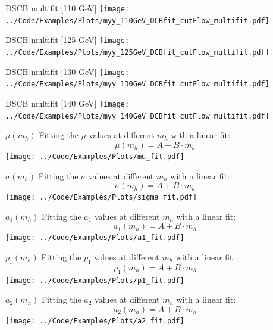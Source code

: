 \documentclass[10pt,UKenglish, leqno, xcolor = dvipsnames]{beamer}
\begin{document}
		\begin{frame}{DSCB multifit [110 GeV]}
			\vfill
			\texttt{[image: ../Code/Examples/Plots/myy\_110GeV\_DCBfit\_cutFlow\_multifit.pdf]}
			\vfill
		\end{frame}
	
		\begin{frame}{DSCB multifit [125 GeV]}
			\vfill
			\texttt{[image: ../Code/Examples/Plots/myy\_125GeV\_DCBfit\_cutFlow\_multifit.pdf]}
			\vfill
		\end{frame}
	
		\begin{frame}{DSCB multifit [130 GeV]}
			\vfill
			\texttt{[image: ../Code/Examples/Plots/myy\_130GeV\_DCBfit\_cutFlow\_multifit.pdf]}
			\vfill
		\end{frame}
	
		\begin{frame}{DSCB multifit [140 GeV]}
			\vfill
			\texttt{[image: ../Code/Examples/Plots/myy\_140GeV\_DCBfit\_cutFlow\_multifit.pdf]}
			\vfill
		\end{frame}
	
		\begin{frame}{$\mu(m_h)$}
			\vfill
			Fitting the $\mu$ values at different $m_h$ with a linear fit:
			$$
			\mu(m_h)=A+B\cdot m_h
			$$
			\centering
			\texttt{[image: ../Code/Examples/Plots/mu\_fit.pdf]}
			\vfill
		\end{frame}
	
		\begin{frame}{$\sigma(m_h)$}
			\vfill
			Fitting the $\sigma$ values at different $m_h$ with a linear fit:
			$$
			\sigma(m_h)=A+B\cdot m_h
			$$
			\centering
			\texttt{[image: ../Code/Examples/Plots/sigma\_fit.pdf]}
			\vfill
		\end{frame}
	
		\begin{frame}{$a_1(m_h)$}
			\vfill
			Fitting the $a_1$ values at different $m_h$ with a linear fit:
			$$
			a_1(m_h)=A+B\cdot m_h
			$$
			\centering
			\texttt{[image: ../Code/Examples/Plots/a1\_fit.pdf]}
			\vfill
		\end{frame}
	
		\begin{frame}{$p_1(m_h)$}
			\vfill
			Fitting the $p_1$ values at different $m_h$ with a linear fit:
			$$
			p_1(m_h)=A+B\cdot m_h
			$$
			\centering
			\texttt{[image: ../Code/Examples/Plots/p1\_fit.pdf]}
			\vfill
		\end{frame}
	
		\begin{frame}{$a_2(m_h)$}
			\vfill
			Fitting the $a_2$ values at different $m_h$ with a linear fit:
			$$
			a_2(m_h)=A+B\cdot m_h
			$$
			\centering
			\texttt{[image: ../Code/Examples/Plots/a2\_fit.pdf]}
			\vfill
		\end{frame}
	
\end{document}
